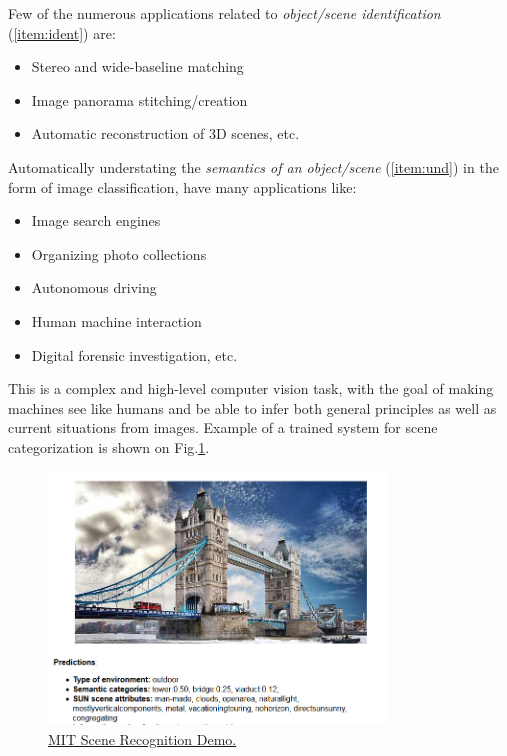 Few of the numerous applications related to {\em object/scene identification} (\ref{item:ident}) are:
\begin{itemize}
\item Stereo and wide-baseline matching
\item Image panorama stitching/creation
\item Automatic reconstruction of 3D scenes, etc.
\end{itemize}

Automatically understating the {\em semantics of an object/scene} (\ref{item:und}) in the form of image classification, have many applications like:
\begin{itemize}
\item Image search engines
\item Organizing photo collections
\item Autonomous driving
\item Human machine interaction
\item Digital forensic investigation, etc.
\end{itemize}

This is a complex and high-level computer vision task, with the goal of making machines see like humans and be able to infer both general principles as well as current situations from images. Example of a trained system for scene categorization is shown on Fig.\ref{fig:mitdemo}.
\begin{figure}[H]
\begin{center}
\includegraphics[width=0.8\textwidth]{fig/mitdemo}
\end{center}
\caption{ \href{http://places.csail.mit.edu/demo.html}{MIT Scene Recognition Demo.}}
\label{fig:mitdemo}
\end{figure}


